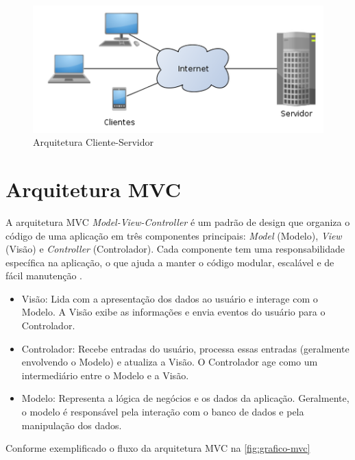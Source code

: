 \begin{figure}[htb]
    \caption{\label{fig:grafico-client-server}Arquitetura Cliente-Servidor}
    \begin{center}
        \includegraphics[scale=0.9]{imagens/arquitetura-cliente-servidor.png}
    \end{center}
\end{figure}


\section{Arquitetura MVC}
A arquitetura MVC \textit{Model-View-Controller} é um padrão de design que organiza o código de uma aplicação em três componentes principais: \textit{Model} (Modelo), \textit{View} (Visão) e \textit{Controller} (Controlador). Cada componente tem uma responsabilidade específica na aplicação, o que ajuda a manter o código modular, escalável e de fácil manutenção \cite{engsoftmoderna}.

\begin{itemize}
    \item Visão: Lida com a apresentação dos dados ao usuário e interage com o Modelo. A Visão exibe as informações e envia eventos do usuário para o Controlador.
    \item Controlador: Recebe entradas do usuário, processa essas entradas (geralmente envolvendo o Modelo) e atualiza a Visão. O Controlador age como um intermediário entre o Modelo e a Visão.
    \item Modelo: Representa a lógica de negócios e os dados da aplicação. Geralmente, o modelo é responsável pela interação com o banco de dados e pela manipulação dos dados.
\end{itemize}
Conforme exemplificado o fluxo da arquitetura MVC na \autoref{fig:grafico-mvc}

